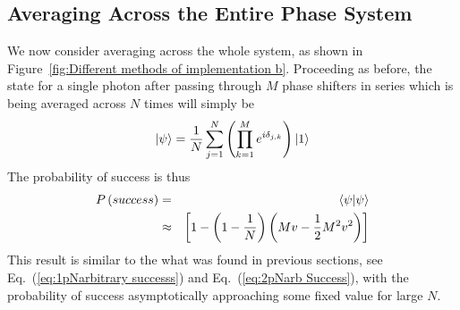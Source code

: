 \documentclass[aps,pra,twocolumn,superscriptaddress,numerical,floatfix]{revtex4-1}
\begin{document}
\subsection{Averaging Across the Entire Phase System\label{Averaging Across the Entire Phase System}}

We now consider averaging across the whole system, as shown in Figure~\ref{fig:Different methods of implementation b}. Proceeding as before, the state for a single photon after passing through $M$ phase shifters in series which is being averaged across $N$ times will simply be
\begin{equation}
	\ket{\psi}=\frac{1}{N}\sum_{j=1}^{N}\left(\prod_{k=1}^{M}e^{i\delta_{j,k}}\right)\ket{1} \label{eq:AvEndPhaseState}
\end{equation}
The probability of success is thus
\begin{eqnarray}
	P\left(success\right) & = & \braket{\psi|\psi} \nonumber \\
& \approx & \left[1-\left(1-\frac{1}{N}\right)\left(Mv-\frac{1}{2}M^{2}v^{2}\right)\right]\label{eq:AveEndProbSuccess}
\end{eqnarray}
This result is similar to the what was found in previous sections, see Eq.~(\ref{eq:1pNarbitrary successs}) and Eq.~(\ref{eq:2pNarb Success}), with the probability of success asymptotically approaching some fixed value for large $N$.
\end{document}
